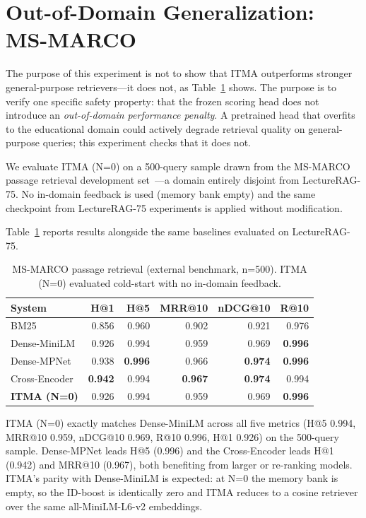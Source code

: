 \documentclass[preprint,12pt]{elsarticle}
\begin{document}
\section{Out-of-Domain Generalization: MS-MARCO}
\label{sec:msmarco}

The purpose of this experiment is not to show that ITMA outperforms stronger
general-purpose retrievers---it does not, as Table~\ref{tab:msmarco} shows.
The purpose is to verify one specific safety property: that the frozen scoring
head does not introduce an \emph{out-of-domain performance penalty}.  A
pretrained head that overfits to the educational domain could actively degrade
retrieval quality on general-purpose queries; this experiment checks that it
does not.

We evaluate ITMA (N=0) on a 500-query sample drawn from the MS-MARCO passage
retrieval development set~\citep{msmarco2016}---a domain entirely disjoint from
LectureRAG-75.  No in-domain feedback is used (memory bank empty) and the same
checkpoint from LectureRAG-75 experiments is applied without modification.

Table~\ref{tab:msmarco} reports results alongside the same baselines evaluated
on LectureRAG-75.

\begin{table}[t]
\centering
\small
\caption{MS-MARCO passage retrieval (external benchmark, n=500).
ITMA (N=0) evaluated cold-start with no in-domain feedback.}
\label{tab:msmarco}
\begin{tabular}{lrrrrr}
\toprule
System & H@1 & H@5 & MRR@10 & nDCG@10 & R@10 \\
\midrule
BM25 & 0.856 & 0.960 & 0.902 & 0.921 & 0.976 \\
Dense-MiniLM & 0.926 & 0.994 & 0.959 & 0.969 & \textbf{0.996} \\
Dense-MPNet & 0.938 & \textbf{0.996} & 0.966 & \textbf{0.974} & \textbf{0.996} \\
Cross-Encoder & \textbf{0.942} & 0.994 & \textbf{0.967} & \textbf{0.974} & 0.994 \\
\textbf{ITMA (N=0)} & 0.926 & 0.994 & 0.959 & 0.969 & \textbf{0.996} \\
\bottomrule
\end{tabular}
\end{table}

ITMA (N=0) exactly matches Dense-MiniLM across all five metrics (H@5 0.994,
MRR@10 0.959, nDCG@10 0.969, R@10 0.996, H@1 0.926) on the 500-query sample.
Dense-MPNet leads H@5 (0.996) and the Cross-Encoder leads H@1 (0.942) and
MRR@10 (0.967), both benefiting from larger or re-ranking models.  ITMA's
parity with Dense-MiniLM is expected: at N=0 the memory bank is empty, so
the ID-boost is identically zero and ITMA reduces to a cosine retriever over
the same all-MiniLM-L6-v2 embeddings.
\end{document}
